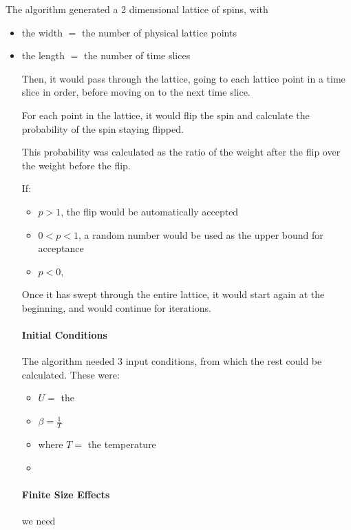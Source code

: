 The algorithm generated a 2 dimensional lattice of spins, with
\begin{itemize}
	\item the width $=$ the number of physical lattice points
	\item the length $=$ the number of time slices

Then, it would pass through the lattice, going to each lattice point in a time slice in order, before moving on to the next time slice.

For each point in the lattice, it would flip the spin and calculate the probability of the spin staying flipped.

This probability was calculated as the ratio of the weight after the flip over the weight before the flip.

If:
\begin{itemize}
	\item $p>1$, the flip would be automatically accepted
	\item $0<p<1$, a random number would be used as the upper bound for acceptance
	\item $p<0$,
\end{itemize}

Once it has swept through the entire lattice, it would start again at the beginning, and would continue for {} iterations.

\paragraph{Initial Conditions}

The algorithm needed 3 input conditions, from which the rest could be calculated.
These were:
\begin{itemize}
	\item $U = $ the
	\item $\beta = \frac{1}{T}$
		\item where $T = $ the temperature
	\item
\end{itemize}



\paragraph{Finite Size Effects}

{}\guide

{} we need {} \guide


\end{itemize}
